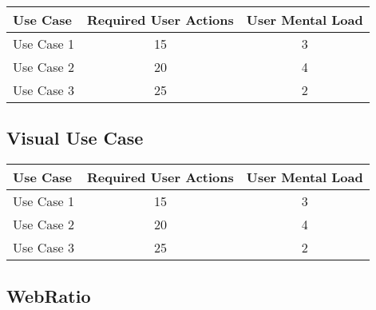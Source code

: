 \begin{tabularx}{\textwidth}{Xcc}
\textbf{Use Case} & \textbf{Required User Actions} & \textbf{User Mental Load}\\
\hline
Use Case 1                          & 15 & 3 \\
Use Case 2                          & 20 & 4 \\
Use Case 3                          & 25 & 2
\end{tabularx}

\subsection{Visual Use Case}




\begin{tabularx}{\textwidth}{Xcc}
\textbf{Use Case} & \textbf{Required User Actions} & \textbf{User Mental Load}\\
\hline
Use Case 1                          & 15 & 3 \\
Use Case 2                          & 20 & 4 \\
Use Case 3                          & 25 & 2
\end{tabularx}

\subsection{WebRatio}

